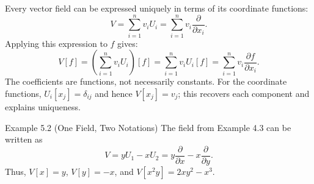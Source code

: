 \documentclass[11pt,letterpaper]{article}
\begin{document}
Every vector field can be expressed uniquely in terms of its coordinate functions:
\begin{equation}
  V=\sum_{i=1}^{n}v_iU_i
  =\sum_{i=1}^{n}v_i\frac{\partial}{\partial x_i}.
\end{equation}
Applying this expression to $f$ gives:
\begin{equation}
  V[f]=\left(\sum_{i=1}^{n}v_iU_i\right)[f]
  =\sum_{i=1}^{n}v_iU_i[f]
  =\sum_{i=1}^{n}v_i\frac{\partial f}{\partial x_i}.
\end{equation}
The coefficients are functions, not necessarily constants. For the coordinate
functions, $U_i[x_j]=\delta_{ij}$ and hence $V[x_j]=v_j$;
this recovers each component and explains uniqueness.

\begin{examplebox}{Example 5.2 (One Field, Two Notations)}
The field from Example 4.3 can be written as
\[
  V=yU_1-xU_2
   =y\frac{\partial}{\partial x}-x\frac{\partial}{\partial y}.
\]
Thus, $V[x]=y$, $V[y]=-x$, and $V[x^2y]=2xy^2-x^3$.
\end{examplebox}
\end{document}
